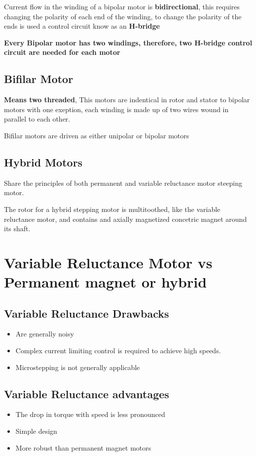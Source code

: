 \documentclass{report}
\begin{document}
Current flow in the winding of a bipolar motor is \textbf{bidirectional}, this requires changing the polarity of
each end of the winding, to change the polarity of the ends is used a control circuit know as an \textbf{H-bridge}

\textbf{Every Bipolar motor has two windings, therefore, two H-bridge control circuit are needed for each motor}

\subsection*{Bifilar Motor}
\textbf{Means two threaded}, This motors are indentical in rotor and stator to bipolar motors with one exeption, each 
winding is made up of two wires wound in parallel to each other. 

Bifilar motors are driven as either unipolar or bipolar motors

\subsection*{Hybrid Motors}
Share the principles of both permanent and variable reluctance motor steeping motor. 

The rotor for a hybrid stepping motor is multitoothed, like the variable reluctance motor, and contains and axially
magnetized concetric magnet around its shaft.

\section*{Variable Reluctance Motor vs Permanent magnet or hybrid}

\subsection*{Variable Reluctance Drawbacks}
\begin{itemize}
  \item Are generally noisy
  \item Complex current limiting control is required to achieve high speeds.
  \item Microstepping is not generally applicable 
\end{itemize}

\subsection*{Variable Reluctance advantages}
\begin{itemize}
  \item The drop in torque with speed is less pronounced
  \item Simple design
  \item More robust than permanent magnet motors
\end{itemize}
\end{document}
